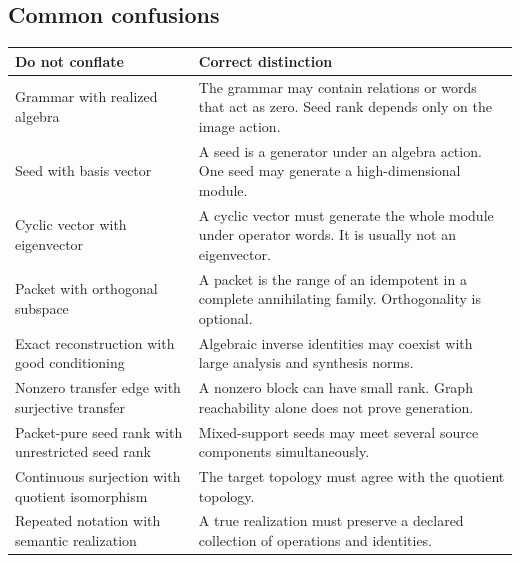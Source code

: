 \subsection{Common confusions}
\begin{center}
\begin{longtable}{@{}>{\raggedright\arraybackslash}p{}>{\raggedright\arraybackslash}p{}@{}}
\toprule
\textbf{Do not conflate} & \textbf{Correct distinction}\\
\midrule
\endhead
Grammar with realized algebra & The grammar may contain relations or words that act as zero.  Seed rank depends only on the image action.\\
Seed with basis vector & A seed is a generator under an algebra action.  One seed may generate a high-dimensional module.\\
Cyclic vector with eigenvector & A cyclic vector must generate the whole module under operator words.  It is usually not an eigenvector.\\
Packet with orthogonal subspace & A packet is the range of an idempotent in a complete annihilating family.  Orthogonality is optional.\\
Exact reconstruction with good conditioning & Algebraic inverse identities may coexist with large analysis and synthesis norms.\\
Nonzero transfer edge with surjective transfer & A nonzero block can have small rank.  Graph reachability alone does not prove generation.\\
Packet-pure seed rank with unrestricted seed rank & Mixed-support seeds may meet several source components simultaneously.\\
Continuous surjection with quotient isomorphism & The target topology must agree with the quotient topology.\\
Repeated notation with semantic realization & A true realization must preserve a declared collection of operations and identities.\\
\bottomrule
\end{longtable}
\end{center}


